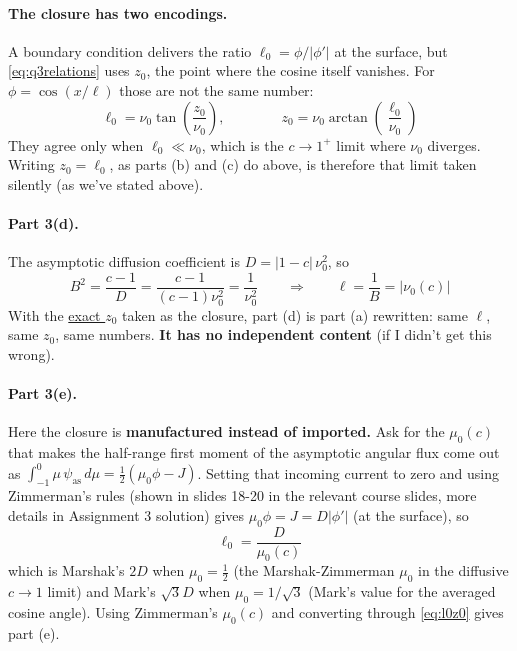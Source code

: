 \documentclass[11pt]{article}
\begin{document}
\paragraph{The closure has two encodings.} A boundary condition delivers the ratio
$\ell_0 = \phi/|\phi'|$ at the surface, but \eqref{eq:q3relations} uses $z_0$, the point where the cosine itself vanishes. For $\phi = \cos(x/\ell)$ those are not the same number:
\begin{equation}
    \ell_0 = \nu_0 \tan\!\left(\frac{z_0}{\nu_0}\right),
    \qquad\qquad
    z_0 = \nu_0 \arctan\!\left(\frac{\ell_0}{\nu_0}\right)
    \label{eq:l0z0}
\end{equation}
They agree only when $\ell_0 \ll \nu_0$, which is the $c \to 1^+$ limit where $\nu_0$ diverges.
Writing $z_0 = \ell_0$, as parts (b) and (c) do above, is therefore that limit taken
silently (as we've stated above).

\paragraph{Part 3(d).} The asymptotic diffusion coefficient is $D = |1-c|\,\nu_0^2$, so
\begin{equation}
    B^2 = \frac{c-1}{D} = \frac{c-1}{(c-1)\nu_0^2} = \frac{1}{\nu_0^2}
    \qquad\Longrightarrow\qquad
    \ell = \frac{1}{B} = |\nu_0(c)|
\end{equation}
With the \underline{exact $z_0$} taken as the closure, part (d) is part (a) rewritten: same $\ell$, same $z_0$,
same numbers. \textbf{It has no independent content} (if I didn't get this wrong). 

\paragraph{Part 3(e).} Here the closure is \textbf{manufactured instead of imported.} Ask for the
$\mu_0(c)$ that makes the half-range first moment of the asymptotic angular flux come out as
$\int_{-1}^{0}\mu\,\psi_{\text{as}}\,d\mu = \tfrac12\left(\mu_0\phi - J\right)$. Setting that
incoming current to zero and using Zimmerman's rules (shown in slides 18-20 in the relevant course slides, more details in Assignment 3 solution) gives $\mu_0 \phi = J = D|\phi'|$ (at the surface), so
\begin{equation}
    \ell_0 = \frac{D}{\mu_0(c)}
\end{equation}
which is Marshak's $2D$ when $\mu_0 = \tfrac12$ (the Marshak-Zimmerman $\mu_0$ in the diffusive $c\to 1$ limit) and Mark's $\sqrt3 D$ when $\mu_0 = 1/\sqrt3$ (Mark's value for the averaged cosine angle).
Using Zimmerman's $\mu_0(c)$ and converting through \eqref{eq:l0z0} gives part (e).
\end{document}
